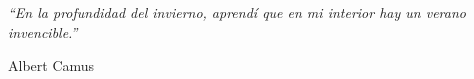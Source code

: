 \begin{dedication}
    \emph{“En la profundidad del invierno, aprendí que en mi interior hay un verano invencible.”}
    
    Albert Camus
\end{dedication}